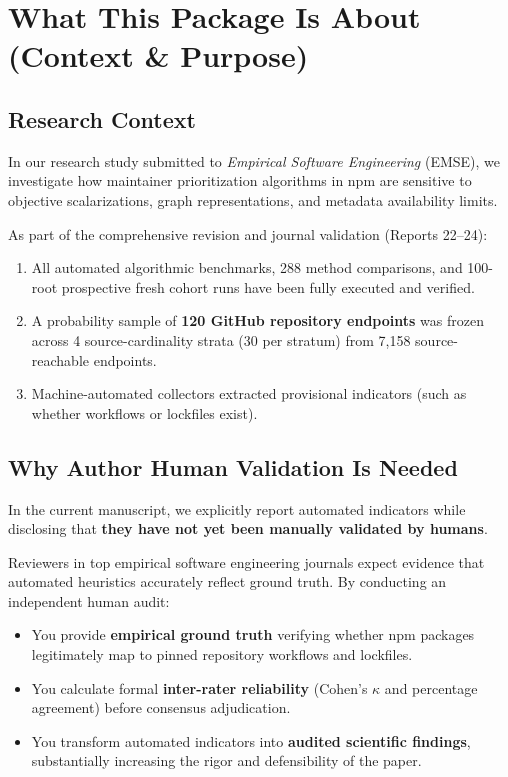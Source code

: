 \documentclass[11pt,a4paper]{article}
\begin{document}
\tableofcontents
\clearpage

\section{What This Package Is About (Context \& Purpose)}

\subsection{Research Context}
In our research study submitted to \textit{Empirical Software Engineering} (EMSE), we investigate how maintainer prioritization algorithms in npm are sensitive to objective scalarizations, graph representations, and metadata availability limits.

As part of the comprehensive revision and journal validation (Reports 22--24):
\begin{enumerate}
  \item All automated algorithmic benchmarks, 288 method comparisons, and 100-root prospective fresh cohort runs have been fully executed and verified.
  \item A probability sample of \textbf{120 GitHub repository endpoints} was frozen across 4 source-cardinality strata (30 per stratum) from 7,158 source-reachable endpoints.
  \item Machine-automated collectors extracted provisional indicators (such as whether workflows or lockfiles exist).
\end{enumerate}

\subsection{Why Author Human Validation Is Needed}
In the current manuscript, we explicitly report automated indicators while disclosing that \textbf{they have not yet been manually validated by humans}. 

Reviewers in top empirical software engineering journals expect evidence that automated heuristics accurately reflect ground truth. By conducting an independent human audit:
\begin{itemize}
  \item You provide \textbf{empirical ground truth} verifying whether npm packages legitimately map to pinned repository workflows and lockfiles.
  \item You calculate formal \textbf{inter-rater reliability} (Cohen's $\kappa$ and percentage agreement) before consensus adjudication.
  \item You transform automated indicators into \textbf{audited scientific findings}, substantially increasing the rigor and defensibility of the paper.
\end{itemize}
\end{document}
